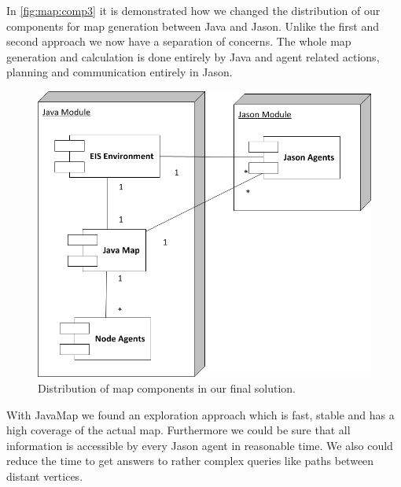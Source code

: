 In \autoref{fig:map:comp3} it is demonstrated how we changed the distribution of our components for map generation between Java and Jason. Unlike the first and second approach we now have a separation of concerns. The whole map generation and calculation is done entirely by Java and agent related actions, planning and communication entirely in Jason.
\begin{figure}
  \centering
  \includegraphics[width=0.6\linewidth]{images/map_comp_3.png}
  \caption{Distribution of map components in our final solution.}
  \label{fig:map:comp3}
\end{figure}

With JavaMap we found an exploration approach which is fast, stable and has a high coverage of the actual map. Furthermore we could be sure that all information is accessible by every Jason agent in reasonable time. We also could reduce the time to get answers to rather complex queries like paths between distant vertices.
